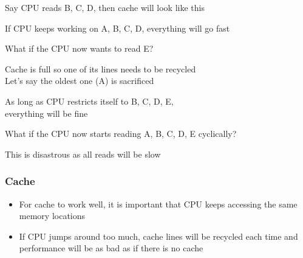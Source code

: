 \begin{frame}
\begin{overprint}
    \begin{center}
      Say CPU reads B, C, D, then cache will look like this
    \end{center}

    \begin{center}
      If CPU keeps working on A, B, C, D, everything will go fast
    \end{center}

    \begin{center}
      What if the CPU now wants to read E?
    \end{center}

    \begin{center}
      Cache is full so one of its lines needs to be recycled \\
      Let's say the oldest one (A) is sacrificed
    \end{center}

    \begin{center}
      As long as CPU restricts itself to B, C, D, E, \\
      everything will be fine
    \end{center}

    \begin{center}
      What if the CPU now starts reading A, B, C, D, E cyclically?
    \end{center}

    \begin{center}
      This is disastrous as all reads will be slow
    \end{center}
  \end{overprint}
\end{frame}

\begin{frame}
  \frametitle{Cache}
  \begin{itemize}
    \item For cache to work well, it is important that CPU keeps accessing the same memory locations
    \item If CPU jumps around too much, cache lines will be recycled each time and performance
          will be as bad as if there is no cache
  \end{itemize}
\end{frame}

